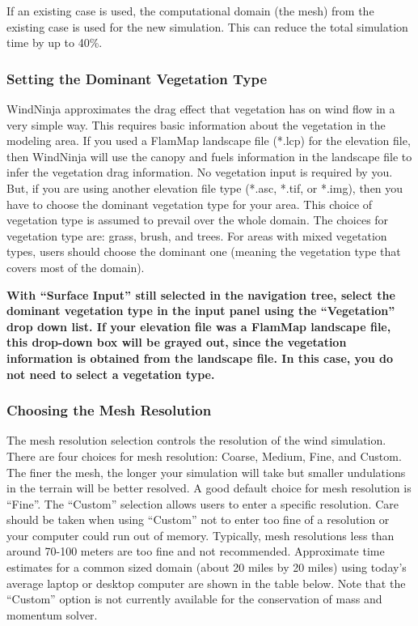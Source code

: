 \documentclass[12pt]{article}
\begin{document}
If an existing case is used, the computational domain (the mesh) from the existing case is used for the new simulation. 
This can reduce the total simulation time by up to 40\%.

\subsubsection{Setting the Dominant Vegetation Type}

WindNinja approximates the drag effect that vegetation has on wind flow in a very simple way.  
This requires basic information about the vegetation in the modeling area.  If you used a FlamMap landscape file (*.lcp) for the elevation file, then WindNinja will use the canopy and fuels information in the landscape file to infer the vegetation drag information.  
No vegetation input is required by you.  But, if you are using another elevation file type (*.asc, *.tif, or *.img), then you have to choose the dominant vegetation type for your area.  
This choice of vegetation type is assumed to prevail over the whole domain.  The choices for vegetation type are:  grass, brush, and trees.  
For areas with mixed vegetation types, users should choose the dominant one (meaning the vegetation type that covers most of the domain).

\textbf{\color{red} With “Surface Input” still selected in the navigation tree, select the dominant vegetation type in the input panel using the “Vegetation” drop down list.  
If your elevation file was a FlamMap landscape file, this drop-down box will be grayed out, since the vegetation information is obtained from the landscape file.  
In this case, you do not need to select a vegetation type.}

\subsubsection{Choosing the Mesh Resolution}

The mesh resolution selection controls the resolution of the wind simulation.  
There are four choices for mesh resolution: Coarse, Medium, Fine, and Custom.  
The finer the mesh, the longer your simulation will take but smaller undulations in the terrain will be better resolved.  
A good default choice for mesh resolution is “Fine”.  The “Custom” selection allows users to enter a specific resolution.  
Care should be taken when using “Custom” not to enter too fine of a resolution or your computer could run out of memory.  
Typically, mesh resolutions less than around 70-100 meters are too fine and not recommended.  
Approximate time estimates for a common sized domain (about 20 miles by 20 miles) using today's average laptop or desktop computer are shown in the table below. 
Note that the “Custom” option is not currently available for the conservation of mass and momentum solver. 
\end{document}
